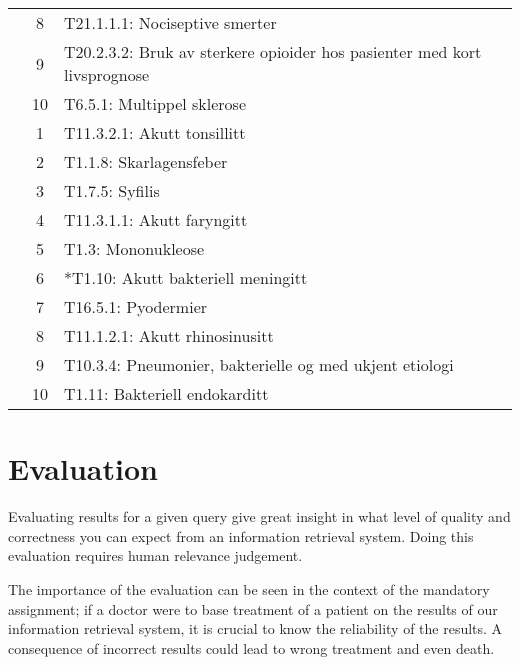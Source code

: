 \documentclass[a4paper, 11pt]{article}
\begin{document}
\begin{table}[htbp]
\begin{tabularx}{\textwidth}{c c X}
	 & 8 & T21.1.1.1: Nociseptive smerter \\
	 & 9 & T20.2.3.2: Bruk av sterkere opioider hos pasienter med kort livsprognose \\
	 & 10 & T6.5.1: Multippel sklerose \\
	\addlinespace
	8 & 1 & T11.3.2.1: Akutt tonsillitt \\
	 & 2 & T1.1.8: Skarlagensfeber \\
	 & 3 & T1.7.5: Syfilis \\
	 & 4 & T11.3.1.1: Akutt faryngitt \\
	 & 5 & T1.3: Mononukleose \\
	 & 6 & *T1.10: Akutt bakteriell meningitt \\
	 & 7 & T16.5.1: Pyodermier \\
	 & 8 & T11.1.2.1: Akutt rhinosinusitt \\
	 & 9 & T10.3.4: Pneumonier, bakterielle og med ukjent etiologi \\
	 & 10 & T1.11: Bakteriell endokarditt \\
	\bottomrule
\end{tabularx}
\end{table}


\section{Evaluation}
\label{sec:evaluation}
Evaluating results for a given query give great insight in what level of quality and correctness you can expect from an information retrieval system. Doing this evaluation requires human relevance judgement.

The importance of the evaluation can be seen in the context of the mandatory assignment; if a doctor were to base treatment of a patient on the results of our information retrieval system, it is crucial to know the reliability of the results. A consequence of incorrect results could lead to wrong treatment and even death.
\end{document}
